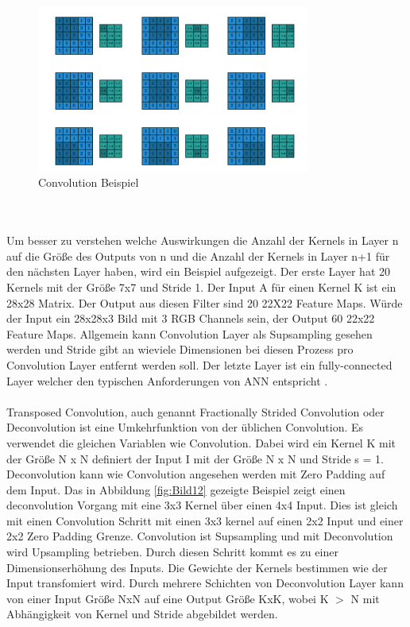 \documentclass{llncs}
\begin{document}
\begin{figure}
	\centering
	\includegraphics[width=0.8\textwidth]{conv.png}
	\caption{Convolution Beispiel\protect\cite{conv}}
	\label{fig:Bild11}
\end{figure}
~\\\\
Um  besser zu verstehen welche Auswirkungen die Anzahl der Kernels in Layer n auf die Größe des Outputs von n und die Anzahl der Kernels in Layer n+1 für den nächsten Layer haben, wird ein Beispiel aufgezeigt. Der erste Layer hat 20 Kernels mit der Größe 7x7 und Stride 1. Der Input A für einen Kernel K ist ein 28x28 Matrix. Der Output aus diesen Filter sind 20 22X22 Feature Maps. Würde der Input ein 28x28x3 Bild mit 3 RGB Channels sein, der Output 60 22x22 Feature Maps. Allgemein kann Convolution Layer als Supsampling gesehen werden und Stride gibt an wieviele Dimensionen bei diesen Prozess pro Convolution Layer entfernt werden soll. Der letzte Layer ist ein fully-connected Layer welcher den typischen Anforderungen von ANN entspricht \cite{conv}.  
\\\\
Transposed Convolution, auch genannt Fractionally Strided Convolution oder Deconvolution ist eine Umkehrfunktion von der üblichen Convolution. Es verwendet die gleichen Variablen wie Convolution. Dabei wird ein Kernel K mit der Größe N x N definiert der Input I mit der Größe N x N und Stride s = 1. Deconvolution kann wie Convolution angesehen werden mit  Zero Padding auf dem Input.  Das in Abbildung \ref{fig:Bild12} gezeigte Beispiel zeigt einen deconvolution Vorgang mit eine 3x3 Kernel über einen 4x4 Input. Dies ist gleich mit einen Convolution Schritt mit einen 3x3 kernel auf einen 2x2 Input und einer 2x2 Zero Padding Grenze. Convolution ist Supsampling und mit Deconvolution wird Upsampling betrieben. Durch diesen Schritt kommt es zu einer Dimensionserhöhung des Inputs. Die Gewichte der Kernels bestimmen wie der Input transfomiert wird. Durch mehrere Schichten von Deconvolution Layer kann von einer Input Größe NxN auf eine Output Größe KxK, wobei K $>$ N mit Abhängigkeit von Kernel und Stride abgebildet werden\cite{conv}. 
\end{document}
